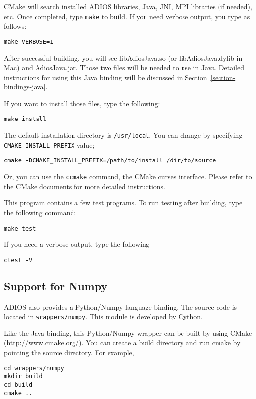 CMake will search installed ADIOS libraries, Java, JNI, MPI libraries (if
needed), etc. Once completed, type \verb+make+ to build. If you need verbose output, you type as follows:
\begin{lstlisting}
make VERBOSE=1
\end{lstlisting}

After successful building, you will see libAdiosJava.so (or
libAdiosJava.dylib in Mac) and AdiosJava.jar. Those two files will be needed to use in Java. Detailed instructions for using this Java binding will be discussed in Section~\ref{section-bindings-java}.

If you want to install those files, type the following:
\begin{lstlisting}
make install
\end{lstlisting}

The default installation directory is \verb+/usr/local+. You can change by
specifying \verb+CMAKE_INSTALL_PREFIX+ value;
\begin{lstlisting}
cmake -DCMAKE_INSTALL_PREFIX=/path/to/install /dir/to/source
\end{lstlisting}

Or, you can use the \verb+ccmake+ command, the CMake curses interface. Please refer to the CMake documents for more detailed instructions.

This program contains a few test programs. To run testing after building,
type the following command:
\begin{lstlisting}
make test
\end{lstlisting}

If you need a verbose output, type the following
\begin{lstlisting}
ctest -V
\end{lstlisting}

\subsection{Support for Numpy}
\label{section-install-numpy}

ADIOS also provides a Python/Numpy language binding. The source code is located in \verb+wrappers/numpy+. This module is developed by Cython.

Like the Java binding, this Python/Numpy wrapper can be built by using CMake (\url{http://www.cmake.org/}). You can create a build directory and run cmake by pointing the source directory. For example, 
\begin{lstlisting}
cd wrappers/numpy
mkdir build
cd build
cmake ..
\end{lstlisting}

